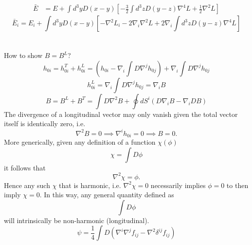 \documentclass[10pt,letterpaper]{article}
\numberwithin{equation}{subsection}
\begin{document}
\begin{align}
\bar E &= E +  \int d^3y D(x-y)\left[ -\frac32 \int d^3z D(y-z) \nabla^4 L + \frac12 \nabla^2 L\right]
\end{align}
\begin{equation}
\bar E_i = E_i +  \int d^3y D(x-y)\left[ -\nabla^2 L_i-2\nabla_i \nabla^2 L +2 \nabla_i  \int d^3z D(y-z) \nabla^4 L\right]
\end{equation}
\\ \\
How to show $B = B^L$?
\begin{equation}
h_{0i} = h_{0i}^T + h_{0i}^L = \left( h_{0i} - \nabla_i \int D \nabla^j h_{0j}\right) +\nabla_i \int D \nabla^j h_{0j}
\end{equation}
\begin{equation}
h_{0i}^L = \nabla_i  \int D \nabla^j h_{0j} = \nabla_i B
\end{equation}
\begin{equation}
B = B^L + B^T =  \int D \nabla^2 B + \oint dS^i(D \nabla_i B - \nabla_i D B)
\end{equation}
The divergence of a longitudinal vector may only vanish given the total vector itself is identically zero, i.e.
\begin{equation}
\nabla^2 B =0 \implies \nabla^i h_{0i} = 0\implies B = 0.
\end{equation}
More generically, given any definition of a function $\chi(\phi)$ 
\begin{equation}
\chi = \int D \phi
\end{equation}
it follows that
\begin{equation}
\nabla^2 \chi = \phi.
\end{equation}
Hence any such $\chi$ that is harmonic, i.e. $\nabla^2 \chi = 0$ necessarily implies $\phi = 0$ to then imply $\chi = 0$. In this way, any general quantity defined as 
\begin{equation}
\int D \phi 
\end{equation}
will intrinsically be non-harmonic (longitudinal). 
\begin{equation}
\psi = \frac{1}{4} \int D (\nabla^i \nabla^j f_{ij} - \nabla^2 \delta^{ij}f_{ij})
\end{equation}
\end{document}
